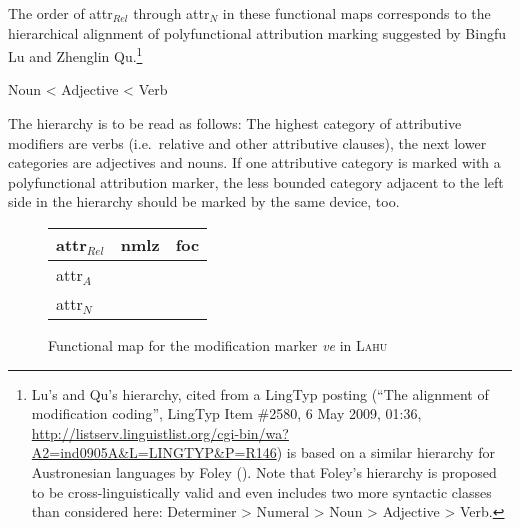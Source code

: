 The order of {\sc attr}$_{Rel}$ through {\sc attr}$_{N}$ in these functional maps corresponds to the hierarchical alignment of polyfunctional attribution marking suggested by Bingfu Lu and Zhenglin Qu.\footnote{Lu's and Qu's hierarchy, cited from a LingTyp posting (“The alignment of modification coding”, LingTyp Item \#2580, 6 May 2009, 01:36, \url{http://listserv.linguistlist.org/cgi-bin/wa?A2=ind0905A&L=LINGTYP&P=R146}) is based on a similar hierarchy for Austronesian languages by Foley (\citeyear{foley1980}). Note that Foley's hierarchy is proposed to be cross-linguistically valid and even includes two more syntactic classes than considered here: Determiner > Numeral > Noun > Adjective > Verb.}
\begin{exe}
\ex	Noun < Adjective < Verb
\end{exe}
The hierarchy is to be read as follows: The highest category of attributive modifiers are verbs (i.e.~relative and other attributive clauses), the next lower categories are adjectives and nouns. If one attributive category is marked with a polyfunctional attribution marker, the less bounded category adjacent to the left side in the hierarchy should be marked by the same device, too.
\begin{figure}
\parbox[b]{\textwidth}{
\begin{center}
\begin{tabular}{| l || c | c |}
\cline{1-1}
\\
\hline
{\sc attr}$_{Rel}$ & {\sc nmlz} & {\sc foc}\\
\hline
{\sc attr}$_{A}$\\
\cline{1-1}
{\sc attr}$_{N}$\\
\cline{1-1}
\end{tabular}
\end{center}
}
\caption[Functional map for modification marking]{Functional map for the modification marker \textit{ve} in \textsc{Lahu}}
\label{lahu funcmap}
\end{figure}

